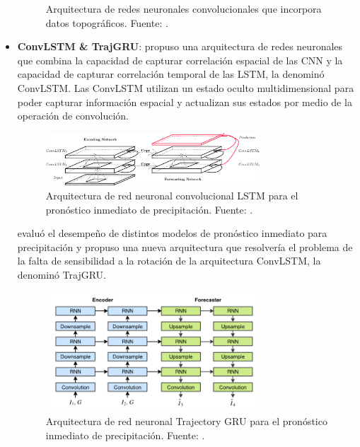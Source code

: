 \begin{itemize}
\begin{figure}[H]
    \caption[Modelo CNN con datos topográficos]{
      Arquitectura de redes neuronales convolucionales que incorpora datos 
      topográficos. Fuente: \cite{Chang2018}.
    }
    \label{fig:chang}
  \end{figure}

  \item \textbf{ConvLSTM \& TrajGRU}: \cite{DBLP:journals/corr/ShiCWYWW15} 
  propuso una arquitectura de redes neuronales que combina la capacidad de 
  capturar correlación espacial de las CNN y la capacidad de capturar 
  correlación temporal de las LSTM, la denominó ConvLSTM. Las ConvLSTM utilizan 
  un estado oculto multidimensional para poder capturar información espacial y 
  actualizan sus estados por medio de la operación de convolución. 
  \begin{figure}[H]
    \centering
    \includegraphics[width=8cm]{E_IMAGENES/3_EstadoArte/convlstm}
    \caption[Modelo ConvLSTM]{
      Arquitectura de red neuronal convolucional LSTM para el pronóstico 
      inmediato de precipitación. Fuente: \cite{DBLP:journals/corr/ShiCWYWW15}.
    }
    \label{fig:convlstm}
  \end{figure}
  \cite{DBLP:journals/corr/ShiGL0YWW17} evaluó el desempeño de distintos 
  modelos de pronóstico inmediato para precipitación y propuso una nueva 
  arquitectura que resolvería el problema de la falta de sensibilidad a la 
  rotación de la arquitectura ConvLSTM, la denominó TrajGRU.
  \begin{figure}[H]
    \centering
    \includegraphics[width=8cm]{E_IMAGENES/3_EstadoArte/trajgru}
    \caption[Modelo TrajGRU]{
      Arquitectura de red neuronal Trajectory GRU para el pronóstico 
      inmediato de precipitación. Fuente: \cite{DBLP:journals/corr/ShiGL0YWW17}.
    }
    \label{fig:trajgru}
  \end{figure}


\end{itemize}
